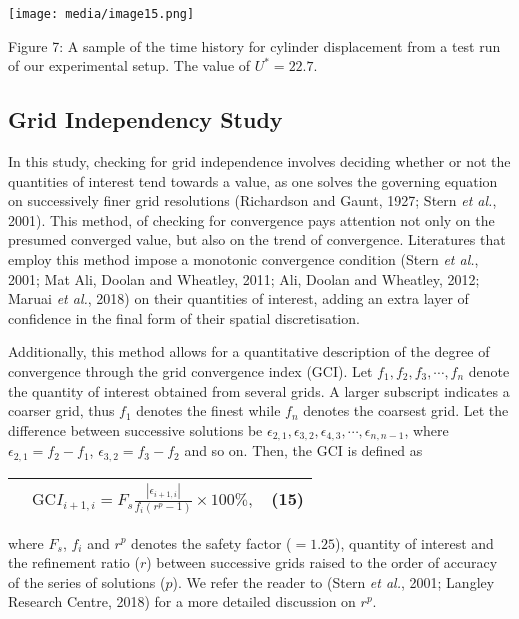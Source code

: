 \documentclass[]{article}
\begin{document}
\texttt{[image: media/image15.png]}

\protect\hypertarget{_Ref40996667}{}{\protect\hypertarget{_Toc41048830}{}{}}Figure
7: A sample of the time history for cylinder displacement from a test
run of our experimental setup. The value of \(U^{*} = 22.7\).

\hypertarget{grid-independency-study}{\subsection{Grid Independency
Study}\label{grid-independency-study}}

In this study, checking for grid independence involves deciding whether
or not the quantities of interest tend towards a value, as one solves
the governing equation on successively finer grid resolutions
(Richardson and Gaunt, 1927; Stern \emph{et al.}, 2001). This method, of
checking for convergence pays attention not only on the presumed
converged value, but also on the trend of convergence. Literatures that
employ this method impose a monotonic convergence condition (Stern
\emph{et al.}, 2001; Mat Ali, Doolan and Wheatley, 2011; Ali, Doolan and
Wheatley, 2012; Maruai \emph{et al.}, 2018) on their quantities of
interest, adding an extra layer of confidence in the final form of their
spatial discretisation.

Additionally, this method allows for a quantitative description of the
degree of convergence through the grid convergence index (GCI). Let
\(f_{1},f_{2},f_{3},\cdots,f_{n}\) denote the quantity of interest
obtained from several grids. A larger subscript indicates a coarser
grid, thus \(f_{1}\) denotes the finest while \(f_{n}\) denotes the
coarsest grid. Let the difference between successive solutions be
\(\epsilon_{2,1},\epsilon_{3,2},\epsilon_{4,3},\cdots,\epsilon_{n,n - 1}\),
where \(\epsilon_{2,1} = f_{2} - f_{1}\),
\(\epsilon_{3,2} = f_{3} - f_{2}\) and so on. Then, the GCI is defined
as

\begin{longtable}[]{@{}lll@{}}
\toprule
&
\(\text{GC}I_{i + 1,i} = F_{s}\frac{\left| \epsilon_{i + 1,i} \right|}{f_{i}\left( r^{p} - 1 \right)} \times 100\%,\)
& (15)\tabularnewline
\midrule
\endhead
\bottomrule
\end{longtable}

where \(F_{s}\), \(f_{i}\) and \(r^{p}\) denotes the safety factor
(\(= 1.25\)), quantity of interest and the refinement ratio (\(r\))
between successive grids raised to the order of accuracy of the series
of solutions (\(p\)). We refer the reader to ­­­­­­(Stern \emph{et al.},
2001; Langley Research Centre, 2018) for a more detailed discussion on
\(r^{p}\).
\end{document}
